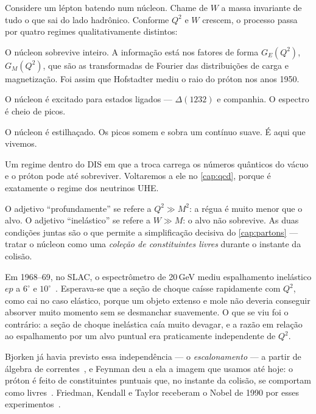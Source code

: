 \documentclass[11pt,a4paper,oneside]{report}
\newcommand{\gev}{\,\mathrm{GeV}}
\newcommand{\Qsq}{Q^{2}}
\begin{document}
Considere um lépton batendo num núcleon. Chame de $W$ a massa invariante de
tudo o que sai do lado hadrônico. Conforme $\Qsq$ e $W$ crescem, o processo passa
por quatro regimes qualitativamente distintos:

\begin{description}[style=nextline,leftmargin=0pt,font=\sffamily\bfseries\color{acento}]
\item[Elástico ($W = M$)] O núcleon sobrevive inteiro. A informação está nos
  fatores de forma $G_E(\Qsq)$, $G_M(\Qsq)$, que são as transformadas de Fourier
  das distribuições de carga e magnetização. Foi assim que Hofstadter mediu o
  raio do próton nos anos 1950.
\item[Ressonante ($M < W \lesssim 2\gev$)] O núcleon é excitado para estados
  ligados --- $\Delta(1232)$ e companhia. O espectro é cheio de picos.
\item[Profundamente inelástico ($W \gg M$ \emph{e} $\Qsq \gg M^2$)] O núcleon é
  estilhaçado. Os picos somem e sobra um contínuo suave. É aqui que vivemos.
\item[Difrativo / $x$ pequeno] Um regime dentro do DIS em que a troca carrega os
  números quânticos do vácuo e o próton pode até sobreviver. Voltaremos a ele no
  \cref{cap:qcd}, porque é exatamente o regime dos neutrinos UHE.
\end{description}

O adjetivo ``profundamente'' se refere a $\Qsq \gg M^2$: a régua é muito menor
que o alvo. O adjetivo ``inelástico'' se refere a $W \gg M$: o alvo não sobrevive.
As duas condições juntas são o que permite a simplificação decisiva do
\cref{cap:partons} --- tratar o núcleon como uma \emph{coleção de constituintes
livres} durante o instante da colisão.

\begin{historia}
Em 1968--69, no SLAC, o espectrômetro de 20\,GeV mediu espalhamento inelástico
$ep$ a $6^\circ$ e $10^\circ$~\cite{Bloom:1969kc,Breidenbach:1969kd}. Esperava-se
que a seção de choque caísse rapidamente com $\Qsq$, como cai no caso elástico,
porque um objeto extenso e mole não deveria conseguir absorver muito momento sem
se desmanchar suavemente. O que se viu foi o contrário: a seção de choque
inelástica caía muito devagar, e a razão em relação ao espalhamento por um alvo
puntual era praticamente independente de $\Qsq$.

Bjorken já havia previsto essa independência --- o \emph{escalonamento} --- a
partir de álgebra de correntes~\cite{Bjorken:1968dy}, e Feynman deu a ela a
imagem que usamos até hoje: o próton é feito de constituintes puntuais que, no
instante da colisão, se comportam como livres~\cite{Feynman:1969ej}. Friedman,
Kendall e Taylor receberam o Nobel de 1990 por esses
experimentos~\cite{Friedman:1972sy}.
\end{historia}
\end{document}
